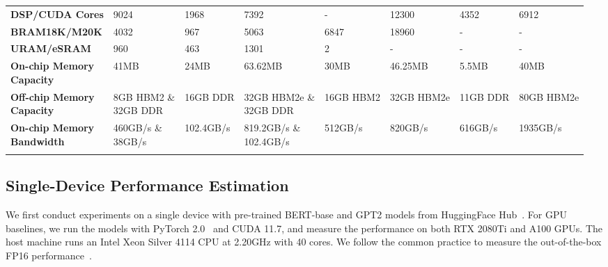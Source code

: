 \begin{table}
{\begin{tabular}{llllllll}
     \textbf{DSP/CUDA Cores} & 9024 & 1968 & 7392 & - & 12300 & 4352 & 6912\\
     \textbf{BRAM18K/M20K} & 4032 & 967 & 5063 & 6847 & 18960 & - & -\\
     \textbf{URAM/eSRAM} & 960 & 463& 1301 & 2 & - & - & -\\
     \makecell[l]{\textbf{On-chip Memory}\\\textbf{Capacity}} & 41MB & 24MB & 63.62MB & 30MB & 46.25MB & 5.5MB & 40MB\\
     \makecell[l]{\textbf{Off-chip Memory}\\\textbf{Capacity}} & \makecell[l]{8GB HBM2 \&\\32GB DDR} & 16GB DDR & \makecell[l]{32GB HBM2e \&\\32GB DDR}& 16GB HBM2 & 32GB HBM2e & 11GB DDR & 80GB HBM2e\\
     \makecell[l]{\textbf{On-chip Memory}\\\textbf{Bandwidth}} & \makecell[l]{460GB/s \&\\38GB/s} & 102.4GB/s & \makecell[l]{819.2GB/s \&\\102.4GB/s} & 512GB/s & 820GB/s & 616GB/s & 1935GB/s\\
     \Xhline{1pt}
    \end{tabular}
    }
\end{table}

\subsection{Single-Device Performance Estimation}
We first conduct experiments on a single device with pre-trained BERT-base and GPT2 models from HuggingFace Hub~\cite{wolf2019huggingface}.
For GPU baselines, we run the models with PyTorch 2.0~\cite{paszke2019pytorch} and CUDA 11.7, and measure the performance on both RTX 2080Ti and A100 GPUs.
The host machine runs an Intel Xeon Silver 4114 CPU at 2.20GHz with 40 cores.
We follow the common practice to measure the out-of-the-box FP16 performance~\cite{aminabadi2022dsinf,fastertransformer2022,radford2019gpt2}.

